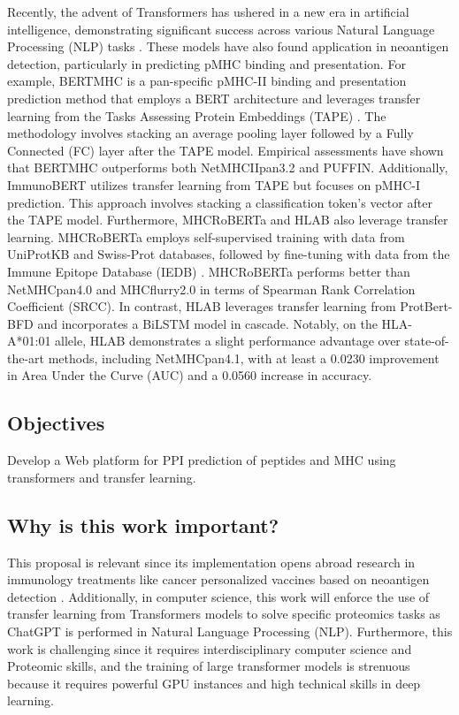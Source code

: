 \documentclass[a4paper,11pt]{article}
\begin{document}
Recently, the advent of Transformers has ushered in a new era in artificial intelligence, demonstrating significant success across various Natural Language Processing (NLP) tasks \cite{patwardhan2023transformers}. These models have also found application in neoantigen detection, particularly in predicting pMHC binding and presentation. For example, BERTMHC \cite{cheng2021bertmhc} is a pan-specific pMHC-II binding and presentation prediction method that employs a BERT architecture and leverages transfer learning from the Tasks Assessing Protein Embeddings (TAPE) \cite{rao2019evaluating}. The methodology involves stacking an average pooling layer followed by a Fully Connected (FC) layer after the TAPE model. Empirical assessments have shown that BERTMHC outperforms both NetMHCIIpan3.2 and PUFFIN. Additionally, ImmunoBERT \cite{gasser2021interpreting} utilizes transfer learning from TAPE but focuses on pMHC-I prediction. This approach involves stacking a classification token's vector after the TAPE model. Furthermore, MHCRoBERTa \cite{wang2022mhcroberta} and HLAB \cite{zhang2022hlab} also leverage transfer learning. MHCRoBERTa employs self-supervised training with data from UniProtKB and Swiss-Prot databases, followed by fine-tuning with data from the Immune Epitope Database (IEDB) \cite{vita2019immune}. MHCRoBERTa performs better than NetMHCpan4.0 and MHCflurry2.0 in terms of Spearman Rank Correlation Coefficient (SRCC). In contrast, HLAB leverages transfer learning from ProtBert-BFD \cite{elnaggar2021prottrans} and incorporates a BiLSTM model in cascade. Notably, on the HLA-A*01:01 allele, HLAB demonstrates a slight performance advantage over state-of-the-art methods, including NetMHCpan4.1, with at least a 0.0230 improvement in Area Under the Curve (AUC) and a 0.0560 increase in accuracy.

\subsection{Objectives}

Develop  a Web platform for PPI prediction of peptides and MHC using transformers and transfer learning. 

\subsection{Why is this work important?}
This proposal is relevant since its implementation opens abroad research in immunology treatments like cancer personalized vaccines based on neoantigen detection \cite{borden2022cancer,chen2021challenges,gopanenko2020main}. Additionally, in computer science, this work will enforce the use of transfer learning from Transformers models to solve specific proteomics tasks as ChatGPT is performed in Natural Language Processing (NLP). Furthermore, this work is challenging since it requires interdisciplinary computer science and Proteomic skills, and the training of large transformer models is strenuous because it requires powerful GPU instances and high technical skills in deep learning.
\end{document}
